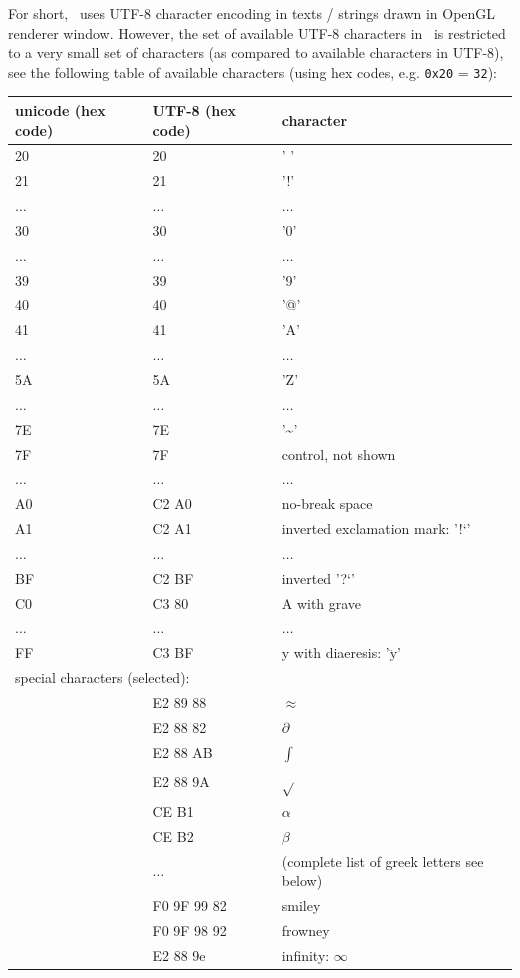 \documentclass[11pt,a4paper]{book}
\begin{document}
For short, \codeName\ uses UTF-8 character encoding in texts / strings drawn in OpenGL renderer window.
However, the set of available UTF-8 characters in \codeName\ is restricted to a very small set of characters (as compared to available characters in UTF-8), see the following table of available characters (using hex codes, e.g. \texttt{0x20} = \texttt{32}):
\begin{center}
  \footnotesize
  \begin{longtable}{| p{2cm} | p{4cm} | p{8cm} |} 
	\hline
  \bf unicode (hex code) & UTF-8 (hex code) & character \\ \hline
  20 & 20 & ' '\\
  21 & 21 & '!'\\
  $\ldots$ & $\ldots$ & $\ldots$\\
  30 & 30 & '0'\\
  $\ldots$ & $\ldots$ & $\ldots$\\
  39 & 39 & '9'\\
  40 & 40 & '@'\\
  41 & 41 & 'A'\\
  $\ldots$ & $\ldots$ & $\ldots$\\
  5A & 5A & 'Z'\\
  $\ldots$ & $\ldots$ & $\ldots$\\
  7E & 7E & '\textasciitilde{}'\\
  7F & 7F & control, not shown\\
  $\ldots$ & $\ldots$ & $\ldots$\\
  A0 & C2 A0 & no-break space\\
  A1 & C2 A1 & inverted exclamation mark: '!`'\\
  $\ldots$ & $\ldots$ & $\ldots$\\
  BF & C2 BF & inverted '?`'\\
  C0 & C3 80 & A with grave\\
  $\ldots$ & $\ldots$ & $\ldots$\\
  FF & C3 BF & y with diaeresis: '$\ddot{\mathrm{y}}$' \\ \hline
	\multicolumn{3}{l}{special characters (selected):} \\ \hline
	 & E2 89 88 & $\approx$ \\
	 & E2 88 82 & $\partial$ \\
	 & E2 88 AB & $\int{}$ \\
	 & E2 88 9A & $\sqrt{}$ \\
	 & CE B1 & $\alpha$ \\
	 & CE B2 & $\beta$ \\
	 & $\ldots$ & (complete list of greek letters see below) \\
   & F0 9F 99 82 & smiley \\
   & F0 9F 98 92 & frowney \\
	 & E2 88 9e & infinity: $\infty$ \\ \hline
	\hline
  \end{longtable}
\end{center}
\end{document}
